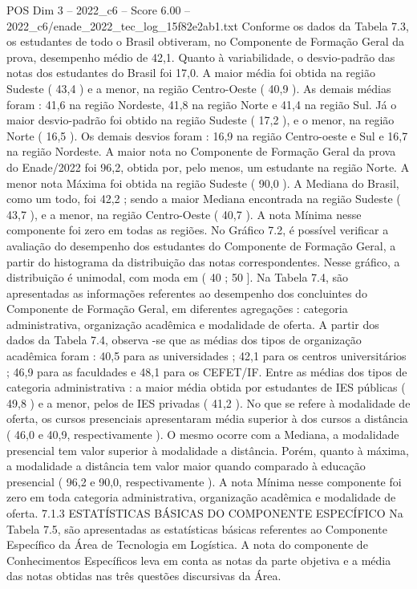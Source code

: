 \begin{textsample}{POS Dim 3 – 2022\_c6 – Score 6.00 – 2022\_c6/enade\_2022\_tec\_log\_15f82e2ab1.txt}
Conforme os dados da Tabela 7.3, os estudantes de todo o Brasil obtiveram, no Componente de Formação Geral da prova, desempenho médio de 42,1.
Quanto à variabilidade, o desvio-padrão das notas dos estudantes do Brasil foi 17,0.
A maior média foi obtida na região Sudeste ( 43,4 ) e a menor, na região Centro-Oeste ( 40,9 ).
As demais médias foram : 41,6 na região Nordeste, 41,8 na região Norte e 41,4 na região Sul.
Já o maior desvio-padrão foi obtido na região Sudeste ( 17,2 ), e o menor, na região Norte ( 16,5 ).
Os demais desvios foram : 16,9 na região Centro-oeste e Sul e 16,7 na região Nordeste.
A maior nota no Componente de Formação Geral da prova do Enade/2022 foi 96,2, obtida por, pelo menos, um estudante na região Norte.
A menor nota Máxima foi obtida na região Sudeste ( 90,0 ).
A Mediana do Brasil, como um todo, foi 42,2 ; sendo a maior Mediana encontrada na região Sudeste ( 43,7 ), e a menor, na região Centro-Oeste ( 40,7 ).
A nota Mínima nesse componente foi zero em todas as regiões.
No Gráfico 7.2, é possível verificar a avaliação do desempenho dos estudantes do Componente de Formação Geral, a partir do histograma da distribuição das notas correspondentes.
Nesse gráfico, a distribuição é unimodal, com moda em ( 40 ; 50 ].
Na Tabela 7.4, são apresentadas as informações referentes ao desempenho dos concluintes do Componente de Formação Geral, em diferentes agregações : categoria administrativa, organização acadêmica e modalidade de oferta.
A partir dos dados da Tabela 7.4, observa -se que as médias dos tipos de organização acadêmica foram : 40,5 para as universidades ; 42,1 para os centros universitários ; 46,9 para as faculdades e 48,1 para os CEFET/IF.
Entre as médias dos tipos de categoria administrativa : a maior média obtida por estudantes de IES públicas ( 49,8 ) e a menor, pelos de IES privadas ( 41,2 ).
No que se refere à modalidade de oferta, os cursos presenciais apresentaram média superior à dos cursos a distância ( 46,0 e 40,9, respectivamente ).
O mesmo ocorre com a Mediana, a modalidade presencial tem valor superior à modalidade a distância.
Porém, quanto à máxima, a modalidade a distância tem valor maior quando comparado à educação presencial ( 96,2 e 90,0, respectivamente ).
A nota Mínima nesse componente foi zero em toda categoria administrativa, organização acadêmica e modalidade de oferta. 7.1.3 ESTATÍSTICAS BÁSICAS DO COMPONENTE ESPECÍFICO Na Tabela 7.5, são apresentadas as estatísticas básicas referentes ao Componente Específico da Área de Tecnologia em Logística.
A nota do componente de Conhecimentos Específicos leva em conta as notas da parte objetiva e a média das notas obtidas nas três questões discursivas da Área.

\end{textsample}
